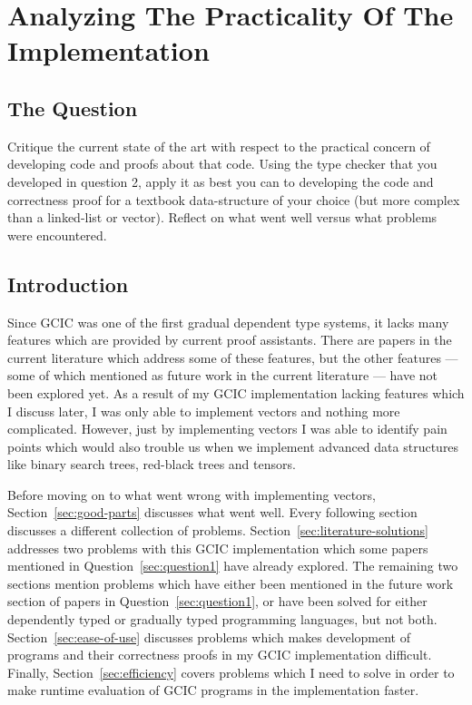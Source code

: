 \documentclass{article}
\theoremstyle{definition}
\begin{document}
\section{Analyzing The Practicality Of The Implementation}\label{sec:question3}

\subsection{The Question}
Critique the current state of the art with respect to the practical concern of
developing code and proofs about that code. Using the type checker that you
developed in question 2, apply it as best you can to developing the code and
correctness proof for a textbook data-structure of your choice (but more complex
than a linked-list or vector). Reflect on what went well versus what problems
were encountered.

\subsection{Introduction}

Since GCIC was one of the first gradual dependent type systems, it lacks many
features which are provided by current proof assistants. There are papers in the
current literature which address some of these features, but the other features
--- some of which mentioned as future work in the current literature --- have
not been explored yet. As a result of my GCIC implementation lacking features
which I discuss later, I was only able to implement vectors and nothing more
complicated. However, just by implementing vectors I was able to identify pain
points which would also trouble us when we implement advanced data structures
like binary search trees, red-black trees and tensors.

Before moving on to what went wrong with implementing vectors,
Section~\ref{sec:good-parts} discusses what went well. Every following section
discusses a different collection of problems.
Section~\ref{sec:literature-solutions} addresses two problems with this GCIC
implementation which some papers mentioned in Question~\ref{sec:question1} have
already explored. The remaining two sections mention problems which have either
been mentioned in the future work section of papers in
Question~\ref{sec:question1}, or have been solved for either dependently typed
or gradually typed programming languages, but not both.
Section~\ref{sec:ease-of-use} discusses problems which makes development of
programs and their correctness proofs in my GCIC implementation difficult.
Finally, Section~\ref{sec:efficiency} covers problems which I need to solve in
order to make runtime evaluation of GCIC programs in the implementation faster.
\end{document}
